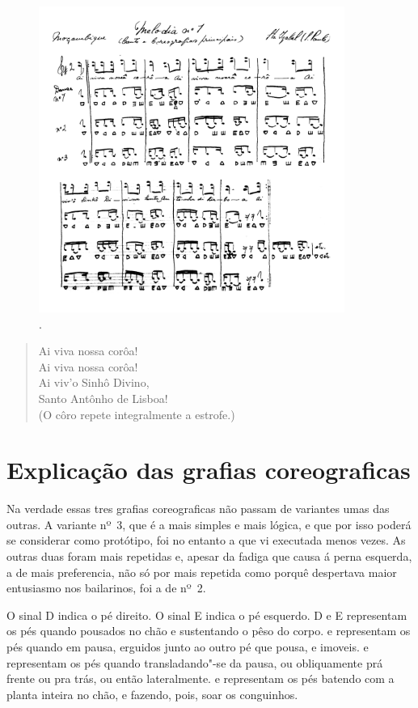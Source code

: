 \begin{figure}[!ht]
\centering
 \includegraphics[width=100mm]{./imgs/img3.png}
\caption{.}
\end{figure}

\begin{verse}
Ai viva nossa corôa!\\
Ai viva nossa corôa!\\
Ai viv'o Sinhô Divino,\\
Santo Antônho de Lisboa!\\[5pt]
(O côro repete integralmente a estrofe.)
\end{verse}

\section{Explicação das grafias coreograficas}

Na verdade essas tres grafias coreograficas não passam de variantes umas
das outras. A variante nº~3, que é a mais simples e mais lógica, e que
por isso poderá se considerar como protótipo, foi no entanto a que vi
executada menos vezes. As outras duas foram mais repetidas e, apesar da
fadiga que causa á perna esquerda, a de mais preferencia, não só por
mais repetida como porquê despertava maior entusiasmo nos bailarinos,
foi a de nº~2.

O sinal D indica o pé direito. O sinal E indica o pé esquerdo. D e E
representam os pés quando pousados no chão e sustentando o pêso do
corpo.  e  representam os pés quando em pausa, erguidos junto ao
outro pé que pousa, e imoveis.  \hspace{.1pt} e  \hspace{.1pt} representam os pés quando
transladando"-se da pausa, ou obliquamente prá frente ou pra trás, ou
então lateralmente.  e   representam os pés batendo com a planta
inteira no chão, e fazendo, pois, soar os conguinhos.

